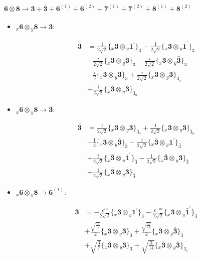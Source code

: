 \documentclass[english]{article}
\newcommand{\cgEqFontsize}{\large}
\newcommand{\rep}[1]{\mathbf{#1}}
\newcommand{\repx}[2]{{}_{#2}\mathbf{#1}}
\newcommand{\tsprod}[2]{\rep{#1}\otimes\rep{#2}}
\newcommand{\tsprodx}[2]{\repx{#1}{x}\otimes\repx{#2}{y}}
\newcommand{\subcgt}[3]{\big\{ \tsprodx{#1}{#2}\big\}^{}_{#3}}
\begin{document}
\paragraph*{\cgEqFontsize $\tsprod{6}{8}\to\rep{3}+\rep{\bar{3}}+\rep{6}^{(1)}+\rep{6}^{(2)}+\rep{7}^{(1)}+\rep{7}^{(2)}+\rep{8}^{(1)}+\rep{8}^{(2)}$}
\begin{itemize}
\item $\tsprodx{6}{8}\to\rep{3}$:
\begin{fleqn}
\begin{align*}
\rep{3} & = \frac{1}{2 \sqrt{2}}\subcgt{3}{1^{\prime}}{3}-\frac{1}{2 \sqrt{2}}\subcgt{3}{\bar{1}^{\prime}}{3} \\ 
 & +\frac{i}{2 \sqrt{2}}\subcgt{3}{3}{3}-\frac{i}{2 \sqrt{2}}\subcgt{3}{\bar{3}}{3} \\ 
 & -\frac{i}{2}\subcgt{\bar{3}}{3}{3}+\frac{i}{2 \sqrt{2}}\subcgt{\bar{3}}{\bar{3}}{3_{s}} \\ 
 & +\frac{i}{2 \sqrt{2}}\subcgt{\bar{3}}{\bar{3}}{3_{a}}
\end{align*}
\end{fleqn}
\item $\tsprodx{6}{8}\to\rep{\bar{3}}$:
\begin{fleqn}
\begin{align*}
\rep{\bar{3}} & = \frac{1}{2 \sqrt{2}}\subcgt{3}{3}{\bar{3}_{s}}+\frac{1}{2 \sqrt{2}}\subcgt{3}{3}{\bar{3}_{a}} \\ 
 & -\frac{1}{2}\subcgt{3}{\bar{3}}{\bar{3}}-\frac{i}{2 \sqrt{2}}\subcgt{\bar{3}}{1^{\prime}}{\bar{3}} \\ 
 & +\frac{i}{2 \sqrt{2}}\subcgt{\bar{3}}{\bar{1}^{\prime}}{\bar{3}}-\frac{1}{2 \sqrt{2}}\subcgt{\bar{3}}{3}{\bar{3}} \\ 
 & +\frac{1}{2 \sqrt{2}}\subcgt{\bar{3}}{\bar{3}}{\bar{3}}
\end{align*}
\end{fleqn}
\item $\tsprodx{6}{8}\to\rep{6}^{(1)}$:
\begin{fleqn}
\begin{align*}
\rep{3} & = -\frac{e^{i \alpha }}{2 \sqrt{2}}\subcgt{3}{1^{\prime}}{3}-\frac{e^{-i \alpha }}{2 \sqrt{2}}\subcgt{3}{\bar{1}^{\prime}}{3} \\ 
 & +\frac{\sqrt{\frac{3}{14}}}{2}\subcgt{3}{3}{3}+\frac{\sqrt{\frac{3}{14}}}{2}\subcgt{3}{\bar{3}}{3} \\ 
 & +\sqrt{\frac{3}{7}}\subcgt{\bar{3}}{3}{3}+\sqrt{\frac{3}{14}}\subcgt{\bar{3}}{\bar{3}}{3_{s}}
\end{align*}

\end{fleqn}
\end{itemize}
\end{document}

